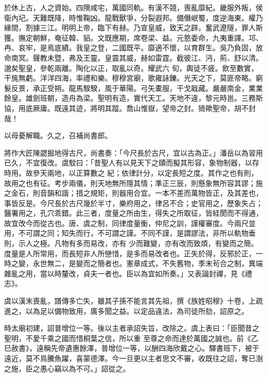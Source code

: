 \begin{pinyinscope}
 於休上古，人之資始。四隩咸宅，萬國同軌。有漢不競，喪亂靡紀。畿服外叛，侯衛內圮。天難既降，時惟鞠凶。龍戰獸爭，分裂遐邦。備僭岷蜀，度逆海東。權乃緣間，割據三江。明明上帝，臨下有赫。乃宣皇威，致天之辟。奮武遼隧，罪人斯獲。撫定朝鮮，奄征韓、貊。文既應期，席卷梁、益。元憝委命，九夷重譯。邛、冉、哀牢，是焉底績。我皇之登，二國既平。靡適不懷，以育群生。吳乃負固，放命南冥。聲教未暨，弗及王靈。皇震其威，赫如雷霆。截彼江、沔，荊、舒以清。邈矣聖皇，參乾兩離。陶化以正，取亂以奇。耀武六
 旬，輿徒不疲。飲至數實，干旄無虧。洋洋四海，率禮和樂。穆穆宮廟，歌雍詠鑠。光天之下，莫匪帝略。窮髮反景，承正受朔。龍馬騤騤，風于華陽。弓矢橐服，干戈戢藏。嚴嚴南金，業業餘皇。雄劍班朝，造舟為梁。聖明有造，實代天工。天地不違，黎元時邕。三務斯協，用底厥庸。既遠其迹，將明其蹤。喬山惟嶽，望帝之封。猗歟聖帝，胡不封哉！



 以母憂解職。久之，召補尚書郎。



 將作大匠陳勰掘地得古尺，尚書奏：「今尺長於古尺，宜以古為正。」潘岳以為習用已久，不宜復改。虞駮曰：「昔聖人有以見天下之賾而擬其形容，象物制器，以存時用。故參天兩地，以正算數之
 紀；依律計分，以定長短之度。其作之也有則，故用之也有征。考步兩儀，則天地無所隱其情；準正三辰，則懸象無所容其謬；施之金石，則音韻和諧；措之規矩，則器用合宜。一本不差而萬物皆正，及其差也，事皆反是。今尺長於古尺幾於半寸，樂府用之，律呂不合；史官用之，歷象失占；醫署用之，孔穴乖錯。此三者，度量之所由生，得失之所取征，皆絓閡而不得通，故宜改今而從古也。唐、虞之制，同律度量衡，仲尼之訓，謹權審度。今兩尺並用，不可謂之同；知失而行，不可謂之謹。不同不謹，是謂謬法，非所以軌物垂則，示人之極。凡物有多而易改，亦有
 少而難變，亦有改而致煩，有變而之簡。度量是人所常用，而長短非人所戀惜，是多而易改者也。正失於得，反邪於正，一時之變，永世無二，是變而之簡者也。憲章成式，不失舊物，季末茍合之制，異端雜亂之用，當以時釐改，貞夫一者也。臣以為宜如所奏。」又表論封禪，見《禮志》。



 虞以漢末喪亂，譜傳多亡失，雖其子孫不能言其先祖，撰《族姓昭穆》十卷，上疏進之，以為足以備物致用，廣多聞之益。以定品違法，為司徒所劾，詔原之。



 時太廟初建，詔普增位一等。後以主者承詔失旨，改除之。虞上表曰：「臣聞昔之聖明，不愛千乘之國而惜桐葉之信，所以重
 至尊之命而達於萬國之誠也。前《乙巳赦書》，遠稱先帝遺惠餘澤，普增位一等，以酬四海欣戴之心。驛書班下，被于遠近，莫不鳥騰魚躍，喜蒙德澤。今一旦更以主者思文不審，收既往之詔，奪已澍之施，臣之愚心竊以為不可。」詔從之。




\end{pinyinscope}
